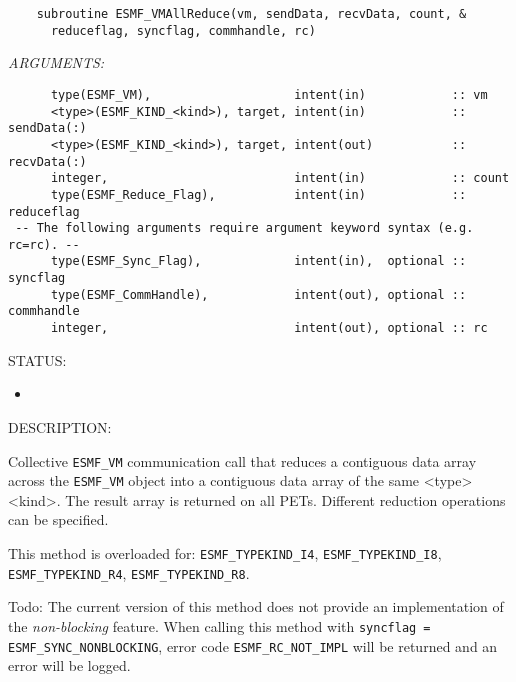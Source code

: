   
\begin{verbatim}    subroutine ESMF_VMAllReduce(vm, sendData, recvData, count, &
      reduceflag, syncflag, commhandle, rc)\end{verbatim}{\em ARGUMENTS:}
\begin{verbatim}      type(ESMF_VM),                    intent(in)            :: vm
      <type>(ESMF_KIND_<kind>), target, intent(in)            :: sendData(:)
      <type>(ESMF_KIND_<kind>), target, intent(out)           :: recvData(:)
      integer,                          intent(in)            :: count
      type(ESMF_Reduce_Flag),           intent(in)            :: reduceflag
 -- The following arguments require argument keyword syntax (e.g. rc=rc). --
      type(ESMF_Sync_Flag),             intent(in),  optional :: syncflag
      type(ESMF_CommHandle),            intent(out), optional :: commhandle
      integer,                          intent(out), optional :: rc\end{verbatim}
{\sf STATUS:}
   \begin{itemize}
   \item{}
   \end{itemize}
  
{\sf DESCRIPTION:\\ }


     Collective {\tt ESMF\_VM} communication call that reduces a contiguous data 
     array across the {\tt ESMF\_VM} object into a contiguous data array of the
     same <type><kind>. The result array is returned on all PETs. 
     Different reduction operations can be specified.
  
     This method is overloaded for:
     {\tt ESMF\_TYPEKIND\_I4}, {\tt ESMF\_TYPEKIND\_I8},
     {\tt ESMF\_TYPEKIND\_R4}, {\tt ESMF\_TYPEKIND\_R8}.
  
     {\sc Todo:} The current version of this method does not provide an 
     implementation of the {\em non-blocking} feature. When calling this 
     method with {\tt syncflag = ESMF\_SYNC\_NONBLOCKING}, error code 
     {\tt ESMF\_RC\_NOT\_IMPL} will be returned and an error will be 
     logged.
  
